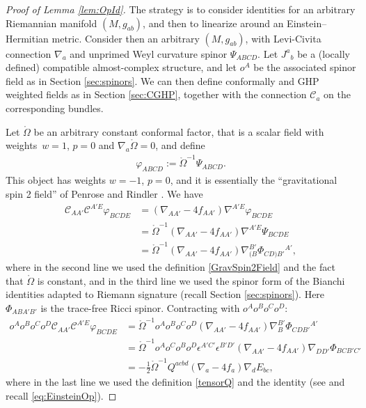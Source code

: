\documentclass[10pt,a4paper]{amsart}
\numberwithin{equation}{section}
\begin{document}
\begin{proof}[Proof of Lemma \ref{lem:OpId}]
The strategy is to consider identities for an arbitrary Riemannian manifold $(M,g_{ab})$, and then to linearize around an Einstein--Hermitian metric. Consider then an arbitrary $(M,g_{ab})$, with Levi-Civita connection $\nabla_{a}$ and unprimed Weyl curvature spinor $\Psi_{ABCD}$. Let $J^{a}{}_{b}$ be a (locally defined) compatible almost-complex structure, and let $o^{A}$ be the associated spinor field as in Section \ref{sec:spinors}. We can then define conformally and GHP weighted fields as in Section \ref{sec:CGHP}, together with the connection $\mathcal{C}_{a}$ on the corresponding bundles.

Let $\mathring\Omega$ be an arbitrary constant conformal factor, that is a scalar field with weights~${w=1}$, ${p=0}$ and $\nabla_{a}\mathring\Omega=0$, and define
\begin{align}\label{GravSpin2Field}
 \varphi_{ABCD} := \mathring\Omega^{-1}\Psi_{ABCD}.
\end{align}
This object has weights $w=-1$, $p=0$, and it is essentially the ``gravitational spin 2 field'' of Penrose and Rindler \cite[equation~(9.6.40)]{PR:II}. We have
\begin{align*}
 \mathcal{C}_{AA'}\mathcal{C}^{A'E}\varphi_{BCDE} &=
(\nabla_{AA'}-4f_{AA'})\nabla^{A'E}\varphi_{BCDE} \\
 &= \mathring\Omega^{-1}(\nabla_{AA'}-4f_{AA'})\nabla^{A'E}\Psi_{BCDE} \\
 &= \mathring\Omega^{-1}(\nabla_{AA'}-4f_{AA'})\nabla_{(B}^{B'}\Phi_{CD)B'}{}^{A'},
\end{align*}
where in the second line we used the definition \eqref{GravSpin2Field} and the fact that $\mathring\Omega$ is constant, and in the third line we used the spinor form of the Bianchi identities \cite[equation~(4.10.7)]{PR:I}
adapted to Riemann signature (recall Section \ref{sec:spinors}).
Here $\Phi_{ABA'B'}$ is the trace-free Ricci spinor. Contracting with $o^Ao^Bo^Co^D$:
\begin{align}\label{AuxId}
\nonumber o^Ao^Bo^Co^D\mathcal{C}_{AA'}\mathcal{C}^{A'E}\varphi_{BCDE} &{} = \mathring\Omega^{-1}o^Ao^Bo^Co^D (\nabla_{AA'}-4f_{AA'})\nabla_{B}^{B'}\Phi_{CDB'}{}^{A'} \\
\nonumber &{} = \mathring\Omega^{-1}o^Ao^Co^Bo^D\epsilon^{A'C'}\epsilon^{B'D'} (\nabla_{AA'}-4f_{AA'})\nabla_{DD'}\Phi_{BCB'C'}\\
&{} = -\frac{1}{2}\mathring\Omega^{-1}Q^{acbd}(\nabla_{a}-4f_{a})\nabla_{d}E_{bc},
\end{align}
where in the last line we used the definition \eqref{tensorQ} and the identity  (see \cite[equa\-tion~(4.6.25)]{PR:I} and recall \eqref{eq:EinsteinOp}).


\end{proof}
\end{document}
